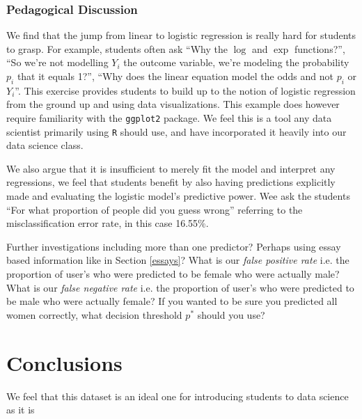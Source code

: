 \documentclass{article}\usepackage[]{graphicx}\usepackage[]{color}
\begin{document}
\subsubsection{Pedagogical Discussion}
We find that the jump from linear to logistic regression is really hard for students to grasp.  For example, students often ask ``Why the $\log$ and $\exp$ functions?'', ``So we're not modelling $Y_i$ the outcome variable, we're modeling the probability $p_i$ that it equals 1?'', ``Why does the linear equation model the odds and not $p_i$ or $Y_i$''.  This exercise provides students to build up to the notion of logistic regression from the ground up and using data visualizations.  This example does however require familiarity with the \verb#ggplot2# package.  We feel this is a tool any data scientist primarily using \verb#R# should use, and have incorporated it heavily into our data science class.

We also argue that it is insufficient to merely fit the model and interpret any regressions, we feel that students benefit by also having predictions explicitly made and evaluating the logistic model's predictive power.  Wee ask the students ``For what proportion of people did you guess wrong'' referring to the misclassification error rate, in this case 16.55\%.

Further investigations including more than one predictor?  Perhaps using essay based information like in Section \ref{essays}?  What is our \textit{false positive rate} i.e. the proportion of user's who were predicted to be female who were actually male?  What is our \textit{false negative rate} i.e. the proportion of user's who were predicted to be male who were actually female?  If you wanted to be sure you predicted all women correctly, what decision threshold $p^*$ should you use?












%
\section{Conclusions}
%
We feel that this dataset is an ideal one for introducing students to data science as it is
\end{document}
